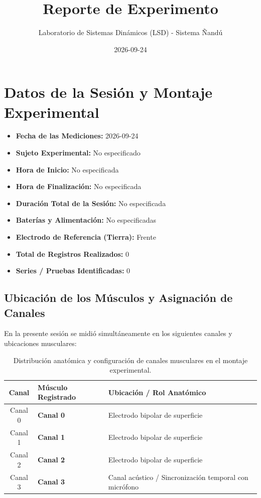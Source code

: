 \documentclass[11pt,a4paper]{article}
\title{\textbf{Reporte de Experimento}}
\author{Laboratorio de Sistemas Dinámicos (LSD) - Sistema Ñandú}
\date{2026-09-24}
\begin{document}
\maketitle

\section{Datos de la Sesión y Montaje Experimental}
\begin{itemize}
    \item \textbf{Fecha de las Mediciones:} 2026-09-24
    \item \textbf{Sujeto Experimental:} No especificado
    \item \textbf{Hora de Inicio:} No especificada
    \item \textbf{Hora de Finalización:} No especificada
    \item \textbf{Duración Total de la Sesión:} No especificada
    \item \textbf{Baterías y Alimentación:} No especificadas
    \item \textbf{Electrodo de Referencia (Tierra):} Frente
    \item \textbf{Total de Registros Realizados:} 0
    \item \textbf{Series / Pruebas Identificadas:} 0
\end{itemize}

\subsection{Ubicación de los Músculos y Asignación de Canales}
En la presente sesión se midió simultáneamente en los siguientes canales y ubicaciones musculares:
\begin{table}[H]
\centering
\begin{tabularx}{\textwidth}{c p{6.5cm} X}
\toprule
\textbf{Canal} & \textbf{Músculo Registrado} & \textbf{Ubicación / Rol Anatómico} \\
\midrule
Canal 0 & \textbf{Canal 0} & Electrodo bipolar de superficie \\
Canal 1 & \textbf{Canal 1} & Electrodo bipolar de superficie \\
Canal 2 & \textbf{Canal 2} & Electrodo bipolar de superficie \\
Canal 3 & \textbf{Canal 3} & Canal acústico / Sincronización temporal con micrófono \\
\bottomrule
\end{tabularx}
\caption{Distribución anatómica y configuración de canales musculares en el montaje experimental.}
\end{table}
\end{document}
